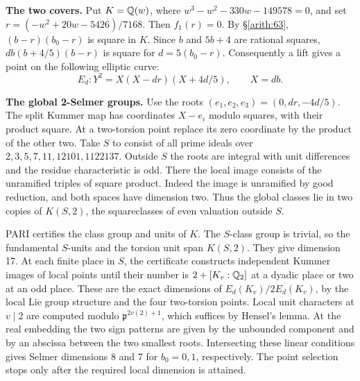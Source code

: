 \textbf{The two covers.} Put \(K=\mathbb Q(w)\), where
\(w^3-w^2-330w-149578=0\), and set
\(r=(-w^2+20w-5426)/7168\). Then \(f_1(r)=0\). By \S\ref{arith:63},
\((b-r)(b_0-r)\) is square in \(K\). Since \(b\) and \(5b+4\) are
rational squares, \(d b(b+4/5)(b-r)\) is square for \(d=5(b_0-r)\).
Consequently a lift gives a point on the following elliptic curve:
\[E_d:Y^2=X(X-dr)(X+4d/5),\qquad X=db .\]

\textbf{The global 2-Selmer groups.} Use the roots
\((e_1,e_2,e_3)=(0,dr,-4d/5)\). The split Kummer map has coordinates
\(X-e_i\) modulo squares, with their product square. At a two-torsion
point replace its zero coordinate by the product of the other two.
Take \(S\) to consist of all prime ideals over
\(2,3,5,7,11,12101,1122137\). Outside \(S\) the roots are integral with
unit differences and the residue characteristic is odd. There the
local image consists of the unramified triples of square product.
Indeed the image is unramified by good reduction, and both spaces have
dimension two. Thus the global classes lie in two copies of
\(K(S,2)\), the squareclasses of even valuation outside \(S\).

PARI certifies the class group and units of \(K\). The \(S\)-class
group is trivial, so the fundamental \(S\)-units and the torsion unit
span \(K(S,2)\). They give dimension 17. At each finite place in \(S\),
the certificate constructs independent Kummer images of local points
until their number is \(2+[K_v:\mathbb Q_2]\) at a dyadic place or
two at an odd place. These are the exact dimensions of
\(E_d(K_v)/2E_d(K_v)\), by the local Lie group structure and the four
two-torsion points. Local unit characters at \(v\mid2\) are computed
modulo \(\mathfrak p^{2v(2)+1}\), which suffices by Hensel's lemma.
At the real embedding the two sign patterns are given by the unbounded
component and by an abscissa between the two smallest roots.
Intersecting these linear conditions gives Selmer dimensions 8 and 7
for \(b_0=0,1\), respectively. The point selection stops only after
the required local dimension is attained.

